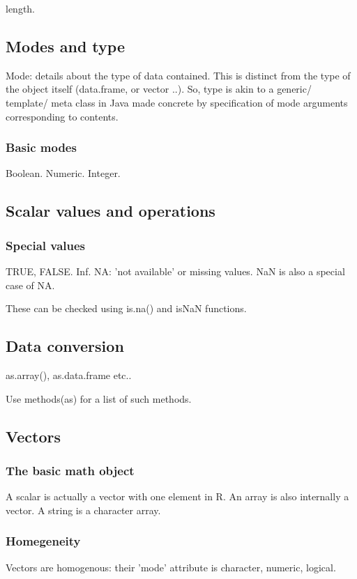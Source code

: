 length.

\subsection{Modes and type}
Mode: details about the type of data contained. This is distinct from the type of the object itself (data.frame, or vector ..). So, type is akin to a generic/ template/ meta class in Java made concrete by specification of mode arguments corresponding to contents.

\subsubsection{Basic modes}
Boolean. Numeric. Integer.

\subsection{Scalar values and operations}
\subsubsection{Special values}
TRUE, FALSE. Inf. NA: 'not available' or missing values. NaN is also a special case of NA.

These can be checked using is.na() and isNaN functions.

\subsection{Data conversion}
as.array(), as.data.frame etc..

Use methods(as) for a list of such methods.

\subsection{Vectors}
\subsubsection{The basic math object}
A scalar is actually a vector with one element in R. An array is also internally a vector. A string is a character array.

\subsubsection{Homegeneity}
Vectors are homogenous: their 'mode' attribute is character, numeric, logical.

